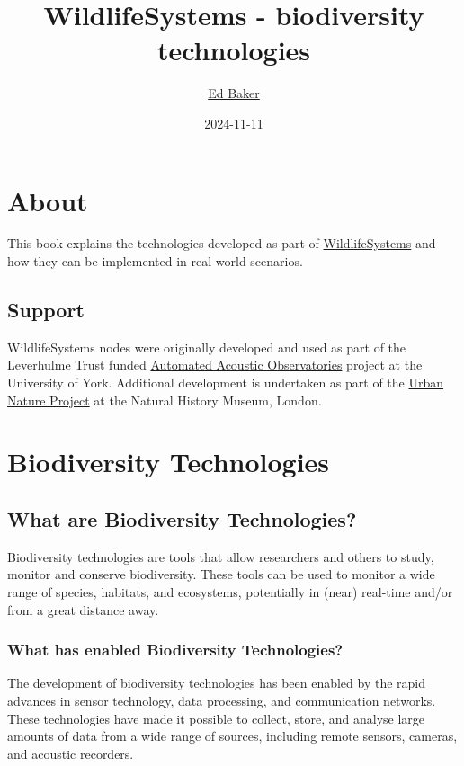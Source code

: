 \documentclass[
]{book}
\title{WildlifeSystems - biodiversity technologies}
\author{\href{https://ebaker.me.uk}{Ed Baker}}
\date{2024-11-11}
\begin{document}
\maketitle

{
\setcounter{tocdepth}{1}
\tableofcontents
}
\chapter*{About}\label{about}

This book explains the technologies developed as part of \href{https://wildlife.systems}{WildlifeSystems} and how they can be implemented in real-world scenarios.

\section*{Support}\label{support}

WildlifeSystems nodes were originally developed and used as part of the Leverhulme Trust funded \href{https://ebaker.me.uk/aao}{Automated Acoustic Observatories} project at the University of York. Additional development is undertaken as part of the \href{https://www.nhm.ac.uk/about-us/urban-nature-project.html}{Urban Nature Project} at the Natural History Museum, London.

\chapter{Biodiversity Technologies}\label{biodiversity-technologies}

\section{What are Biodiversity Technologies?}\label{what-are-biodiversity-technologies}

Biodiversity technologies are tools that allow researchers and others to study, monitor and
conserve biodiversity. These tools can be used to monitor a wide range of species, habitats, and ecosystems, potentially in (near) real-time and/or from a great distance away.

\subsection{What has enabled Biodiversity Technologies?}\label{what-has-enabled-biodiversity-technologies}

The development of biodiversity technologies has been enabled by the rapid advances in sensor technology, data processing, and communication networks. These technologies have made it possible to collect, store, and analyse large amounts of data from a wide range of sources, including remote sensors, cameras, and acoustic recorders.
\end{document}
